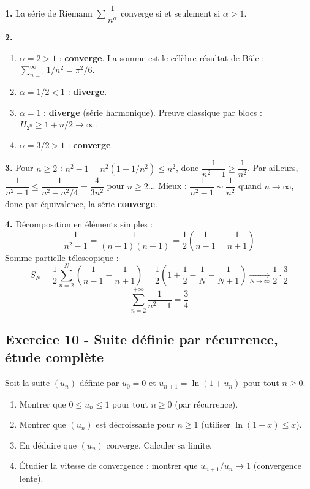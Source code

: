 \documentclass[12pt,a4paper]{article}
\begin{document}
\begin{boitecorrige}
\textbf{1.} La série de Riemann $\sum\dfrac{1}{n^\alpha}$ converge si et seulement si $\alpha > 1$.

\textbf{2.}
\begin{enumerate}[label=(\alph*)]
  \item $\alpha = 2 > 1$ : \textbf{converge}. La somme est le célèbre résultat de Bâle : $\sum_{n=1}^\infty 1/n^2 = \pi^2/6$.
  \item $\alpha = 1/2 < 1$ : \textbf{diverge}.
  \item $\alpha = 1$ : \textbf{diverge} (série harmonique). Preuve classique par blocs : $H_{2^n} \geq 1 + n/2 \to\infty$.
  \item $\alpha = 3/2 > 1$ : \textbf{converge}.
\end{enumerate}

\textbf{3.} Pour $n\geq2$ : $n^2-1 = n^2(1-1/n^2) \leq n^2$, donc $\dfrac{1}{n^2-1}\geq\dfrac{1}{n^2}$. Par ailleurs, $\dfrac{1}{n^2-1}\leq\dfrac{1}{n^2-n^2/4} = \dfrac{4}{3n^2}$ pour $n\geq2$... Mieux : $\dfrac{1}{n^2-1}\sim\dfrac{1}{n^2}$ quand $n\to\infty$, donc par équivalence, la série \textbf{converge}.

\textbf{4.} Décomposition en éléments simples :
\[
\frac{1}{n^2-1} = \frac{1}{(n-1)(n+1)} = \frac{1}{2}\!\left(\frac{1}{n-1}-\frac{1}{n+1}\right)
\]
Somme partielle télescopique :
\[
S_N = \frac{1}{2}\sum_{n=2}^{N}\!\left(\frac{1}{n-1}-\frac{1}{n+1}\right) = \frac{1}{2}\!\left(1+\frac{1}{2}-\frac{1}{N}-\frac{1}{N+1}\right)\xrightarrow[N\to\infty]{}\frac{1}{2}\cdot\frac{3}{2}
\]
\[
\boxed{\sum_{n=2}^{+\infty}\frac{1}{n^2-1} = \frac{3}{4}}
\]
\end{boitecorrige}

\subsection*{Exercice 10 - Suite définie par récurrence, étude complète \niveau{\difficile}}

\begin{boiteexercice}
Soit la suite $(u_n)$ définie par $u_0 = 0$ et $u_{n+1} = \ln(1+u_n)$ pour tout $n\geq0$.
\begin{enumerate}
  \item Montrer que $0 \leq u_n \leq 1$ pour tout $n\geq0$ (par récurrence).
  \item Montrer que $(u_n)$ est décroissante pour $n\geq1$ (utiliser $\ln(1+x) \leq x$).
  \item En déduire que $(u_n)$ converge. Calculer sa limite.
  \item Étudier la vitesse de convergence : montrer que $u_{n+1}/u_n \to 1$ (convergence lente).
\end{enumerate}
\end{boiteexercice}
\end{document}
